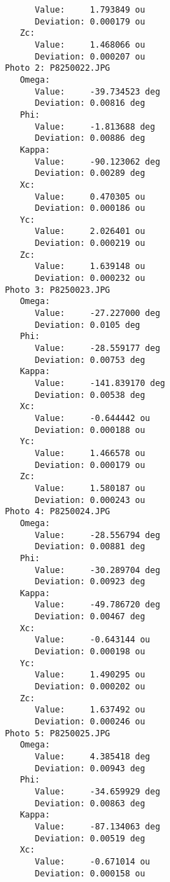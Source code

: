\documentclass{article}
\begin{document}
\begin{verbatim}
                  Value:     1.793849 ou
                  Deviation: 0.000179 ou
               Zc:
                  Value:     1.468066 ou
                  Deviation: 0.000207 ou
            Photo 2: P8250022.JPG
               Omega:
                  Value:     -39.734523 deg
                  Deviation: 0.00816 deg
               Phi:
                  Value:     -1.813688 deg
                  Deviation: 0.00886 deg
               Kappa:
                  Value:     -90.123062 deg
                  Deviation: 0.00289 deg
               Xc:
                  Value:     0.470305 ou
                  Deviation: 0.000186 ou
               Yc:
                  Value:     2.026401 ou
                  Deviation: 0.000219 ou
               Zc:
                  Value:     1.639148 ou
                  Deviation: 0.000232 ou
            Photo 3: P8250023.JPG
               Omega:
                  Value:     -27.227000 deg
                  Deviation: 0.0105 deg
               Phi:
                  Value:     -28.559177 deg
                  Deviation: 0.00753 deg
               Kappa:
                  Value:     -141.839170 deg
                  Deviation: 0.00538 deg
               Xc:
                  Value:     -0.644442 ou
                  Deviation: 0.000188 ou
               Yc:
                  Value:     1.466578 ou
                  Deviation: 0.000179 ou
               Zc:
                  Value:     1.580187 ou
                  Deviation: 0.000243 ou
            Photo 4: P8250024.JPG
               Omega:
                  Value:     -28.556794 deg
                  Deviation: 0.00881 deg
               Phi:
                  Value:     -30.289704 deg
                  Deviation: 0.00923 deg
               Kappa:
                  Value:     -49.786720 deg
                  Deviation: 0.00467 deg
               Xc:
                  Value:     -0.643144 ou
                  Deviation: 0.000198 ou
               Yc:
                  Value:     1.490295 ou
                  Deviation: 0.000202 ou
               Zc:
                  Value:     1.637492 ou
                  Deviation: 0.000246 ou
            Photo 5: P8250025.JPG
               Omega:
                  Value:     4.385418 deg
                  Deviation: 0.00943 deg
               Phi:
                  Value:     -34.659929 deg
                  Deviation: 0.00863 deg
               Kappa:
                  Value:     -87.134063 deg
                  Deviation: 0.00519 deg
               Xc:
                  Value:     -0.671014 ou
                  Deviation: 0.000158 ou

\end{verbatim}
\end{document}
